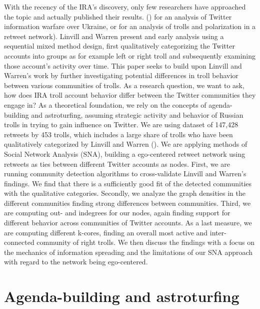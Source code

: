 \documentclass[12pt, titlepage=true, toc=bib]{scrartcl}
\begin{document}
With the recency of the IRA's discovery, only few researchers have approached the topic and actually published their results. (\cite[cf.]{golovchenko_state_2018}) for an analysis of Twitter information warfare over Ukraine, or  \cite{stewart_examining_2018} for an analysis of trolls and polarization in a retweet network). Linvill and Warren \cite*{linvill_troll_2018} present and early analysis using a sequential mixed method design, first qualitatively categorizing the Twitter accounts into groups as for example left or right troll and subsequently examining those account's activity over time. This paper seeks to build upon Linvill and Warren's work by further investigating potential differences in troll behavior between various communities of trolls. As a research question, we want to ask, how does IRA troll account behavior differ between the Twitter communities they engage in? As a theoretical foundation, we rely on the concepts of agenda-building and astroturfing, assuming strategic activity and behavior of Russian trolls in trying to gain influence on Twitter. We are using dataset of 147,428 retweets by 453 trolls, which includes a large share of trolls who have been qualitatively categorized by Linvill and Warren (\cite{linvill_troll_2018}). We are applying methods of Social Network Analysis (SNA), building a ego-centered retweet network using retweets as ties between different Twitter accounts as nodes. First, we are running community detection algorithms to cross-validate Linvill and Warren's \cite*{linvill_troll_2018} findings. We find that there is a sufficiently good fit of the detected communities with the qualitative categories. Secondly, we analyze the graph densities in the different communities finding strong differences between communities. Third, we are computing out- and indegrees for our nodes, again finding support for different behavior across communities of Twitter accounts. As a last measure, we are computing different k-cores, finding an overall most active and inter-connected community of right trolls. We then discuss the findings with a focus on the mechanics of information spreading and the limitations of our SNA approach with regard to the network being ego-centered.


\section{Agenda-building and astroturfing}
\end{document}
